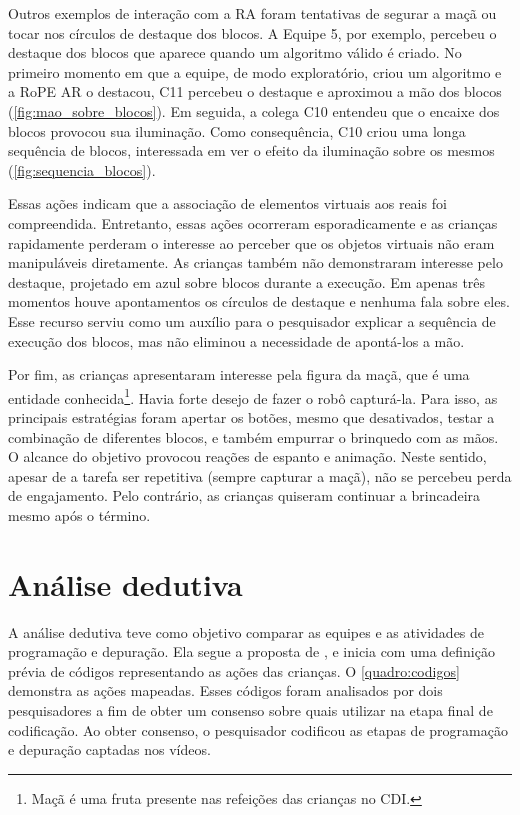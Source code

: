 Outros exemplos de interação com a RA foram tentativas de segurar a maçã ou tocar nos círculos de destaque dos blocos. A Equipe 5, por exemplo, percebeu o destaque dos blocos que aparece quando um algoritmo válido é criado. No primeiro momento em que a equipe, de modo exploratório, criou um algoritmo e a RoPE AR o destacou, C11 percebeu o destaque e aproximou a mão dos blocos (\autoref{fig:mao_sobre_blocos}). Em seguida, a colega C10 entendeu que o encaixe dos blocos provocou sua iluminação. Como consequência, C10 criou uma longa sequência de blocos, interessada em ver o efeito da iluminação sobre os mesmos  (\autoref{fig:sequencia_blocos}).

Essas ações indicam que a associação de elementos virtuais aos reais foi compreendida. Entretanto, essas ações ocorreram esporadicamente e as crianças rapidamente perderam o interesse ao perceber que os objetos virtuais não eram manipuláveis diretamente. As crianças também não demonstraram interesse pelo destaque, projetado em azul sobre blocos durante a execução. Em apenas três momentos houve apontamentos os círculos de destaque e nenhuma fala sobre eles. Esse recurso serviu como um auxílio para o pesquisador explicar a sequência de execução dos blocos, mas não eliminou a necessidade de apontá-los a mão.

Por fim, as crianças apresentaram interesse pela figura da maçã, que é uma entidade conhecida\footnote{Maçã é uma fruta presente nas refeições das crianças no CDI.}. Havia forte desejo de fazer o robô capturá-la. Para isso, as principais estratégias foram apertar os botões, mesmo que desativados, testar a combinação de diferentes blocos, e também empurrar o brinquedo com as mãos. O alcance do objetivo provocou reações de espanto e animação. Neste sentido, apesar de a tarefa ser repetitiva (sempre capturar a maçã), não se percebeu perda de engajamento. Pelo contrário, as crianças quiseram continuar a brincadeira mesmo após o término.

\section{Análise dedutiva}

A análise dedutiva teve como objetivo comparar as equipes e as atividades de programação e depuração. Ela segue a proposta de , e inicia com uma definição prévia de códigos representando as ações das crianças. O \autoref{quadro:codigos} demonstra as ações mapeadas. Esses códigos foram analisados por dois pesquisadores a fim de obter um consenso sobre quais utilizar na etapa final de codificação. Ao obter consenso, o pesquisador codificou as etapas de programação e depuração captadas nos vídeos.

